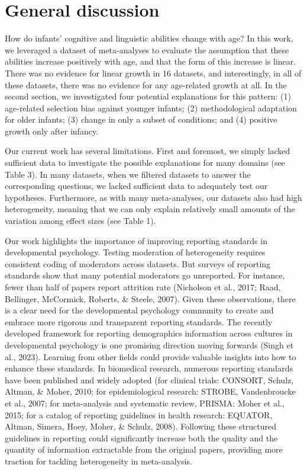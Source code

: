 \documentclass[
  man]{apa6}
\begin{document}
\hypertarget{general-discussion}{%
\section{General discussion}\label{general-discussion}}

How do infants' cognitive and linguistic abilities change with age? In this work, we leveraged a dataset of meta-analyses to evaluate the assumption that these abilities increase positively with age, and that the form of this increase is linear. There was no evidence for linear growth in 16 datasets, and interestingly, in all of these datasets, there was no evidence for any age-related growth at all. In the second section, we investigated four potential explanations for this pattern: (1) age-related selection bias against younger infants; (2) methodological adaptation for older infants; (3) change in only a subset of conditions; and (4) positive growth only after infancy.

Our current work has several limitations. First and foremost, we simply lacked sufficient data to investigate the possible explanations for many domains (see Table 3). In many datasets, when we filtered datasets to answer the corresponding questions, we lacked sufficient data to adequately test our hypotheses. Furthermore, as with many meta-analyses, our datasets also had high heterogeneity, meaning that we can only explain relatively small amounts of the variation among effect sizes (see Table 1).

Our work highlights the importance of improving reporting standards in developmental psychology. Testing moderation of heterogeneity requires consistent coding of moderators across datasets. But surveys of reporting standards show that many potential moderators go unreported. For instance, fewer than half of papers report attrition rate (Nicholson et al., 2017; Raad, Bellinger, McCormick, Roberts, \& Steele, 2007). Given these observations, there is a clear need for the developmental psychology community to create and embrace more rigorous and transparent reporting standards. The recently developed framework for reporting demographics information across cultures in developmental psychology is one promising direction moving forwards (Singh et al., 2023). Learning from other fields could provide valuable insights into how to enhance these standards. In biomedical research, numerous reporting standards have been published and widely adopted (for clinical trials: CONSORT, Schulz, Altman, \& Moher, 2010; for epidemiological research: STROBE, Vandenbroucke et al., 2007; for meta-analysis and systematic review, PRISMA: Moher et al., 2015; for a catalog of reporting guidelines in health research: EQUATOR, Altman, Simera, Hoey, Moher, \& Schulz, 2008). Following these structured guidelines in reporting could significantly increase both the quality and the quantity of information extractable from the original papers, providing more traction for tackling heterogeneity in meta-analysis.
\end{document}
